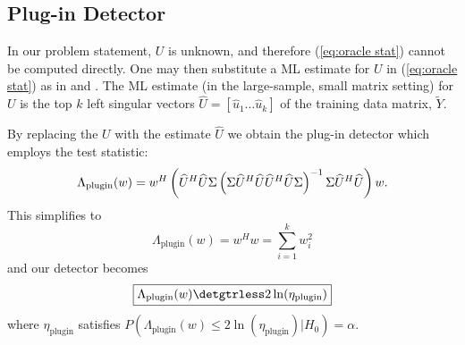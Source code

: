 
\subsection{Plug-in Detector}

In our problem statement, $U$ is unknown, and therefore (\ref{eq:oracle stat}) cannot be computed directly. One may then substitute a ML estimate for $U$ in (\ref{eq:oracle stat}) as in \cite{jin2005cfar} and \cite{mcwhorter2003matched}. The ML estimate (in the large-sample, small matrix setting) for $U$ is the top $k$ left singular vectors $\widehat{U}=[\widehat{u}_1 \dots \widehat{u}_{k}]$ of the training data matrix, $\widetilde{Y}$.

By replacing the $U$ with the estimate $\widehat{U}$ we obtain the plug-in detector which employs the test statistic:
\begin{equation*}
\Lambda_{\text{plugin}}(w)= w^H\left(\widehat{U}^H\widehat{U}\Sigma\left(\Sigma\widehat{U}^H\widehat{U}\widehat{U}^H\widehat{U}\Sigma\right)^{-1}\Sigma\widehat{U}^H\widehat{U}\right)w.\\
\end{equation*}
This simplifies to
\begin{equation}\label{eq:plugin stat}
\boxed{\Lambda_{\text{plugin}}(w) = w^Hw=\sum_{i=1}^kw_i^2}
\end{equation}
and our detector becomes
\begin{equation}\label{eq:plugin classifier}
\boxed{\Lambda_{\text{plugin}}(w) \detgtrless 2\ln(\eta_{\text{plugin}})}
\end{equation}
where $\eta_{\text{plugin}}$ satisfies $P(\Lambda_{\text{plugin}}(w)\leq2\ln\left(\eta_{\text{plugin}}\right)|H_0)=\alpha$.

